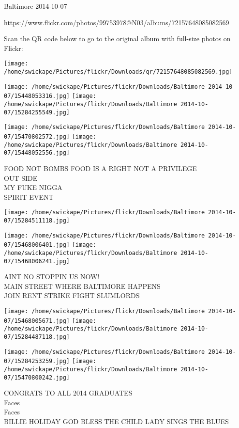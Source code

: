 \documentclass[10pt,letterpaper]{article}
\begin{document}
Baltimore 2014-10-07

https://www.flickr.com/photos/99753978@N03/albums/72157648085082569

Scan the QR code below to go to the original album with full-size photos on Flickr:

\texttt{[image: /home/swickape/Pictures/flickr/Downloads/qr/72157648085082569.jpg]}
\pagebreak

\texttt{[image: /home/swickape/Pictures/flickr/Downloads/Baltimore 2014-10-07/15448053316.jpg]}
\texttt{[image: /home/swickape/Pictures/flickr/Downloads/Baltimore 2014-10-07/15284255549.jpg]}

\texttt{[image: /home/swickape/Pictures/flickr/Downloads/Baltimore 2014-10-07/15470802572.jpg]}
\texttt{[image: /home/swickape/Pictures/flickr/Downloads/Baltimore 2014-10-07/15448052556.jpg]}

FOOD NOT BOMBS FOOD IS A RIGHT NOT A PRIVILEGE\\
OUT SIDE\\
MY FUKE NIGGA\\
SPIRIT EVENT\\
\pagebreak

\texttt{[image: /home/swickape/Pictures/flickr/Downloads/Baltimore 2014-10-07/15284511118.jpg]}

\vspace{0.25in}
\texttt{[image: /home/swickape/Pictures/flickr/Downloads/Baltimore 2014-10-07/15468006401.jpg]}
\texttt{[image: /home/swickape/Pictures/flickr/Downloads/Baltimore 2014-10-07/15468006241.jpg]}

AINT NO STOPPIN US NOW!\\
MAIN STREET WHERE BALTIMORE HAPPENS\\
JOIN RENT STRIKE FIGHT SLUMLORDS\\
\pagebreak

\texttt{[image: /home/swickape/Pictures/flickr/Downloads/Baltimore 2014-10-07/15468005671.jpg]}
\texttt{[image: /home/swickape/Pictures/flickr/Downloads/Baltimore 2014-10-07/15284487118.jpg]}

\texttt{[image: /home/swickape/Pictures/flickr/Downloads/Baltimore 2014-10-07/15284253259.jpg]}
\texttt{[image: /home/swickape/Pictures/flickr/Downloads/Baltimore 2014-10-07/15470800242.jpg]}

CONGRATS TO ALL 2014 GRADUATES\\
Faces\\
Faces\\
BILLIE HOLIDAY GOD BLESS THE CHILD LADY SINGS THE BLUES\\
\pagebreak
\end{document}
